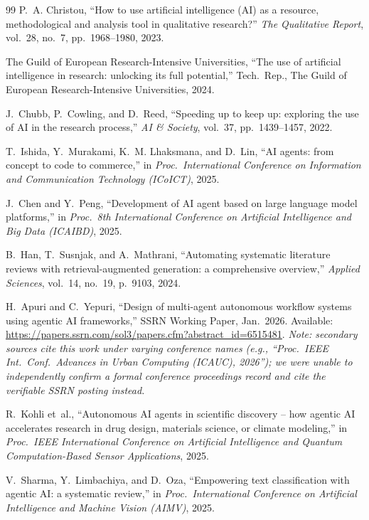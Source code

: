 \documentclass[sn-basic,Numbered]{sn-jnl}
\begin{document}
\begin{thebibliography}{99}
P.~A. Christou,
``How to use artificial intelligence (AI) as a resource, methodological
and analysis tool in qualitative research?''
\emph{The Qualitative Report}, vol.~28, no.~7, pp.~1968--1980, 2023.

The Guild of European Research-Intensive Universities,
``The use of artificial intelligence in research: unlocking its full
potential,''
Tech.\ Rep., The Guild of European Research-Intensive Universities,
2024.

J.~Chubb, P.~Cowling, and D.~Reed,
``Speeding up to keep up: exploring the use of AI in the research
process,''
\emph{AI \& Society}, vol.~37, pp.~1439--1457, 2022.

T.~Ishida, Y.~Murakami, K.~M. Lhaksmana, and D.~Lin,
``AI agents: from concept to code to commerce,''
in \emph{Proc.\ International Conference on Information and
Communication Technology (ICoICT)}, 2025.

J.~Chen and Y.~Peng,
``Development of AI agent based on large language model platforms,''
in \emph{Proc.\ 8th International Conference on Artificial
Intelligence and Big Data (ICAIBD)}, 2025.

B.~Han, T.~Susnjak, and A.~Mathrani,
``Automating systematic literature reviews with retrieval-augmented
generation: a comprehensive overview,''
\emph{Applied Sciences}, vol.~14, no.~19, p.~9103, 2024.

H.~Apuri and C.~Yepuri,
``Design of multi-agent autonomous workflow systems using agentic AI
frameworks,'' SSRN Working Paper, Jan.\ 2026. Available:
\url{https://papers.ssrn.com/sol3/papers.cfm?abstract_id=6515481}.
\emph{Note: secondary sources cite this work under varying conference
names (e.g., ``Proc.\ IEEE Int.\ Conf.\ Advances in Urban Computing
(ICAUC), 2026''); we were unable to independently confirm a formal
conference proceedings record and cite the verifiable SSRN posting
instead.}

R.~Kohli et~al.,
``Autonomous AI agents in scientific discovery -- how agentic AI
accelerates research in drug design, materials science, or climate
modeling,''
in \emph{Proc.\ IEEE International Conference on Artificial
Intelligence and Quantum Computation-Based Sensor Applications}, 2025.

V.~Sharma, Y.~Limbachiya, and D.~Oza,
``Empowering text classification with agentic AI: a systematic review,''
in \emph{Proc.\ International Conference on Artificial Intelligence
and Machine Vision (AIMV)}, 2025.


\end{thebibliography}
\end{document}
